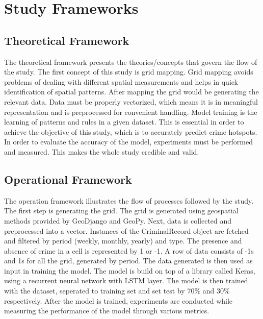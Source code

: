 
\chapter{Study Frameworks}  %

\section{Theoretical Framework}
    The theoretical framework presents the theories/concepts that govern the flow of the study. The first concept of this study is grid mapping. Grid mapping avoids problems of dealing with different spatial measurements and helps in quick identification of spatial patterns. After mapping the grid would be generating the relevant data. Data must be properly vectorized, which means it is in meaningful representation and is preprocessed for convenient handling. Model training is the learning of patterns and rules in a given dataset. This is essential in order to achieve the objective of this study, which is to accurately predict crime hotspots. In order to evaluate the accuracy of the model, experiments must be performed and measured. This makes the whole study credible and valid.


\section{Operational Framework}
    The operation framework illustrates the flow of processes followed by the study. The first step is generating the grid. The grid is generated using geospatial methods provided by GeoDjango and GeoPy. Next, data is collected and preprocessed into a vector. Instances of the CriminalRecord object are fetched and filtered by period (weekly, monthly, yearly) and type. The presence and absence of crime in a cell is represented by 1 or -1. A row of data consists of -1s and 1s for all the grid, generated by period. The data generated is then used as input in training the model. The model is build on top of a library called Keras, using a recurrent neural network with LSTM layer. The model is then trained with the dataset, seperated to training set and set test by 70\% and 30\% respectively. After the model is trained, experiments are conducted while measuring the performance of the model through various metrics.